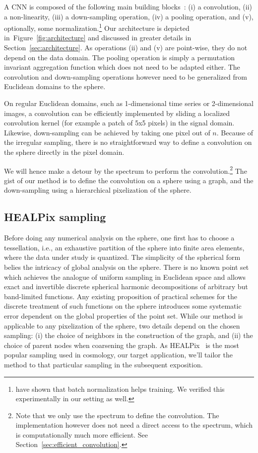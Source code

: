 \documentclass[final,twocolumn,3p,times,authoryear]{elsarticle}
\newcommand{\figref}[1]{Figure~\ref{fig:#1}}
\newcommand{\secref}[1]{Section~\ref{sec:#1}}
\newcommand{\1}{\b{1}}              %
\newcommand{\0}{\b{0}}              %
\begin{document}
A CNN is composed of the following main building blocks~\citep{lecun1998cnn}: (i) a convolution, (ii) a non-linearity, (iii) a down-sampling operation, (iv) a pooling operation, and (v), optionally, some normalization.\footnote{\citet{ioffe2015batchnorm} have shown that batch normalization helps training. We verified this experimentally in our setting as well.} Our architecture is depicted in~\figref{architecture} and discussed in greater details in \secref{architecture}. As operations (ii) and (v) are point-wise, they do not depend on the data domain. The pooling operation is simply a permutation invariant aggregation function which does not need to be adapted either. The convolution and down-sampling operations however need to be generalized from Euclidean domains to the sphere.

On regular Euclidean domains, such as 1-dimensional time series or 2-dimensional images, a convolution can be efficiently implemented by sliding a localized convolution kernel (for example a patch of 5x5 pixels) in the signal domain. Likewise, down-sampling can be achieved by taking one pixel out of $n$.
Because of the irregular sampling, there is no straightforward way to define a convolution on the sphere directly in the pixel domain.

We will hence make a detour by the spectrum to perform the convolution.\footnote{Note that we only use the spectrum to define the convolution. The implementation however does not need a direct access to the spectrum, which is computationally much more efficient. See \secref{efficient_convolution}.}
The gist of our method is to define the convolution on a sphere using a graph, and the down-sampling using a hierarchical pixelization of the sphere.

\subsection{HEALPix sampling}
\label{sec:healpix}

Before doing any numerical analysis on the sphere, one first has to choose a tessellation, i.e., an exhaustive partition of the sphere into finite area elements, where the data under study is quantized.
The simplicity of the spherical form belies the intricacy of global analysis on the sphere. There is no known point set which achieves the analogue of uniform sampling in Euclidean space and allows exact and invertible discrete spherical harmonic decompositions of arbitrary but band-limited functions. Any existing proposition of practical schemes for the discrete treatment of such functions on the sphere introduces some systematic error dependent on the global properties of the point set.
While our method is applicable to any pixelization of the sphere, two details depend on the chosen sampling: (i) the choice of neighbors in the construction of the graph, and (ii) the choice of parent nodes when coarsening the graph.
As HEALPix~\citep{gorski2005healpix} is the most popular sampling used in cosmology, our target application, we'll tailor the method to that particular sampling in the subsequent exposition.
\end{document}
